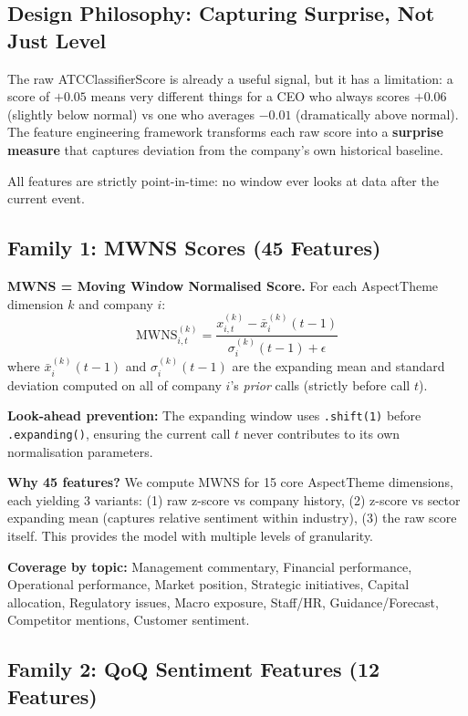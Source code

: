 \documentclass[11pt,a4paper]{article}
\begin{document}
\subsection{Design Philosophy: Capturing Surprise, Not Just Level}

The raw ATCClassifierScore is already a useful signal, but it has a limitation: a score of $+0.05$ means very different things for a CEO who always scores $+0.06$ (slightly below normal) vs one who averages $-0.01$ (dramatically above normal). The feature engineering framework transforms each raw score into a \textbf{surprise measure} that captures deviation from the company's own historical baseline.

All features are strictly point-in-time: no window ever looks at data after the current event.

\subsection{Family 1: MWNS Scores (45 Features)}

\textbf{MWNS = Moving Window Normalised Score.} For each AspectTheme dimension $k$ and company $i$:
\[
\text{MWNS}_{i,t}^{(k)} = \frac{x_{i,t}^{(k)} - \bar{x}_i^{(k)}(t-1)}{\sigma_i^{(k)}(t-1) + \epsilon}
\]
where $\bar{x}_i^{(k)}(t-1)$ and $\sigma_i^{(k)}(t-1)$ are the expanding mean and standard deviation computed on all of company $i$'s \emph{prior} calls (strictly before call $t$).

\textbf{Look-ahead prevention:} The expanding window uses \texttt{.shift(1)} before \texttt{.expanding()}, ensuring the current call $t$ never contributes to its own normalisation parameters.

\textbf{Why 45 features?} We compute MWNS for 15 core AspectTheme dimensions, each yielding 3 variants: (1) raw z-score vs company history, (2) z-score vs sector expanding mean (captures relative sentiment within industry), (3) the raw score itself. This provides the model with multiple levels of granularity.

\textbf{Coverage by topic:} Management commentary, Financial performance, Operational performance, Market position, Strategic initiatives, Capital allocation, Regulatory issues, Macro exposure, Staff/HR, Guidance/Forecast, Competitor mentions, Customer sentiment.

\subsection{Family 2: QoQ Sentiment Features (12 Features)}
\end{document}
